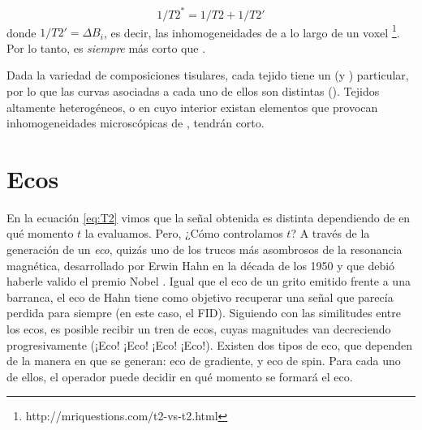 \begin{equation}
 1/T2^* = 1/T2 + 1/T2'
\end{equation}
donde $1/T2'= \Delta B_i$, es decir, las inhomogeneidades de \Bzero a lo largo de un voxel \footnote{http://mriquestions.com/t2-vs-t2.html}. Por lo tanto, \Ttwostar es \textit{siempre} más corto que \Ttwo.


Dada la variedad de composiciones tisulares, cada tejido tiene un \Ttwo (y \Ttwostar) particular, por lo que las curvas asociadas a cada uno de ellos son distintas (\figurapendiente). Tejidos altamente heterogéneos, o en cuyo interior existan elementos que provocan inhomogeneidades microscópicas de \Bzero, tendrán \Ttwo corto.

\section{Ecos}
En la ecuación \ref{eq:T2} vimos que la señal obtenida es distinta dependiendo de en qué momento $t$ la evaluamos. Pero, ¿Cómo controlamos $t$? A través de la generación de un \textit{eco}, quizás uno de los trucos más asombrosos de la resonancia magnética, desarrollado por Erwin Hahn en la década de los 1950 y que debió haberle valido el premio Nobel \citep{mansfield2013long}. Igual que el eco de un grito emitido frente a una barranca, el eco de Hahn tiene como objetivo recuperar una señal que parecía perdida para siempre (en este caso, el FID). Siguiendo con las similitudes entre los ecos, es posible recibir un tren de ecos, cuyas magnitudes van decreciendo progresivamente ({\Large ¡Eco!} {\normalsize ¡Eco!} {\small ¡Eco!} {\tiny ¡Eco!}). Existen dos tipos de eco, que dependen de la manera en que se generan: eco de gradiente, y eco de spin. Para cada uno de ellos, el operador puede decidir en qué momento se formará el eco.

